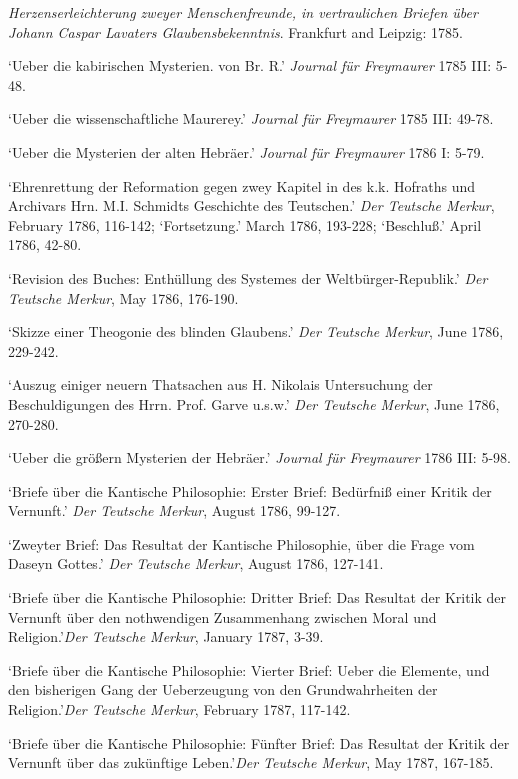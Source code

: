 \textit{Herzenserleichterung zweyer Menschenfreunde, in vertraulichen Briefen \"{u}ber Johann Caspar Lavaters Glaubensbekenntnis}. Frankfurt and Leipzig: 1785.

`Ueber die kabirischen Mysterien. von Br. R\textasteriskcentered \textasteriskcentered .' \textit{Journal f\"{u}r Freymaurer} 1785 III: 5{-}48.

`Ueber die wissenschaftliche Maurerey.' \textit{Journal f\"{u}r Freymaurer} 1785 III: 49{-}78.

`Ueber die Mysterien der alten Hebr\"{a}er.' \textit{Journal f\"{u}r Freymaurer} 1786 I: 5{-}79.

`Ehrenrettung der Reformation gegen zwey Kapitel in des k.k. Hofraths und Archivars Hrn. M.I. Schmidts Geschichte des Teutschen.' \textit{Der Teutsche Merkur}, February 1786, 116{-}142; `Fortsetzung.' March 1786, 193{-}228; `Beschlu\ss{}.' April 1786, 42{-}80.

`Revision des Buches: Enth\"{u}llung des Systemes der Weltb\"{u}rger{-}Republik.' \textit{Der Teutsche Merkur}, May 1786, 176{-}190.

`Skizze einer Theogonie des blinden Glaubens.' \textit{Der Teutsche Merkur}, June 1786, 229{-}242.

`Auszug einiger neuern Thatsachen aus H. Nikolais Untersuchung der Beschuldigungen des Hrrn. Prof. Garve u.s.w.' \textit{Der Teutsche Merkur}, June 1786, 270{-}280. 

`Ueber die gr\"{o}\ss{}ern Mysterien der Hebr\"{a}er.' \textit{Journal f\"{u}r Freymaurer} 1786 III: 5{-}98.

`Briefe \"{u}ber die Kantische Philosophie: Erster Brief: Bed\"{u}rfni\ss{} einer Kritik der Vernunft.' \textit{Der Teutsche Merkur}, August 1786, 99{-}127.

`Zweyter Brief: Das Resultat der Kantische Philosophie, \"{u}ber die Frage vom Daseyn Gottes.' \textit{Der Teutsche Merkur}, August 1786, 127{-}141.

`Briefe \"{u}ber die Kantische Philosophie: Dritter Brief: Das Resultat der Kritik der Vernunft \"{u}ber den nothwendigen Zusammenhang zwischen Moral und Religion.'\textit{Der Teutsche Merkur}, January 1787, 3{-}39.

`Briefe \"{u}ber die Kantische Philosophie: Vierter Brief: Ueber die Elemente, und den bisherigen Gang der Ueberzeugung von den Grundwahrheiten der Religion.'\textit{Der Teutsche Merkur}, February 1787, 117{-}142. 

`Briefe \"{u}ber die Kantische Philosophie: F\"{u}nfter Brief: Das Resultat der Kritik der Vernunft \"{u}ber das zuk\"{u}nftige Leben.'\textit{Der Teutsche Merkur}, May 1787, 167{-}185.

